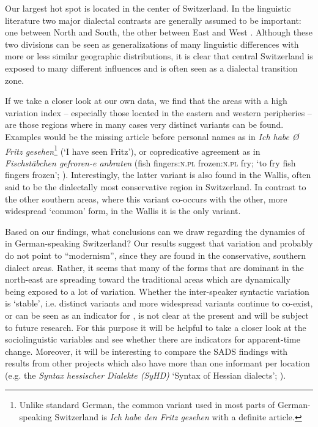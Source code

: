 \documentclass[output=paper]{LSP/langsci}
\begin{document}
Our largest hot spot is located in the center of Switzerland. In the linguistic literature two major dialectal contrasts are generally assumed to be important: one between North and South, the other between East and West \citep[61-67]{haas_deutschsprachige_2000}. Although these two divisions can be seen as generalizations of many linguistic differences with more or less similar geographic distributions, it is clear that central Switzerland is exposed to many different influences and is often seen as a dialectal transition zone.

If we take a closer look at our own data, we find that the areas with a high variation index – especially those located in the eastern and western peripheries – are those regions where in many cases very distinct variants can be found. Examples would be the missing article before personal names as in \emph{Ich habe Ø Fritz gesehen}\footnote{ Unlike standard German, the common variant used in most parts of German-speaking Switzerland is \textit{Ich habe den Fritz gesehen} with a definite article.} (‘I have seen Fritz’), or copredicative agreement as in \emph{Fischstäbchen gefroren-e anbraten} (fish fingers:\textsc{n.pl} frozen:\textsc{n.pl} fry; ‘to fry fish fingers frozen’; \citealt{berger_depictive_2005}). Interestingly, the latter variant is also found in the Wallis, often said to be the dialectally most conservative region in Switzerland. In contrast to the other southern areas, where this variant co-occurs with the other, more widespread ‘common’ form, in the Wallis it is the only variant.

Based on our findings, what conclusions can we draw regarding the dynamics of  in German-speaking Switzerland? Our results suggest that variation and  probably do not point to ``modernism'', since they are found in the conservative, southern dialect areas. Rather, it seems that many of the forms that are dominant in the north-east are spreading toward the traditional areas which are dynamically being exposed to a lot of variation. Whether the inter-speaker syntactic variation is ‘stable’, i.e. distinct variants and more widespread variants continue to co-exist, or can be seen as an indicator for , is not clear at the present \citep{glaser_wandel_2014} and will be subject to future research. For this purpose it will be helpful to take a closer look at the sociolinguistic variables and see whether there are indicators for apparent-time change. Moreover, it will be interesting to compare the SADS findings with results from other  projects which also have more than one informant per location (e.g. the \emph{Syntax hessischer Dialekte (SyHD)} ‘Syntax of Hessian dialects’; \citealt{fleischer_erhebung_2012}). 
\end{document}
